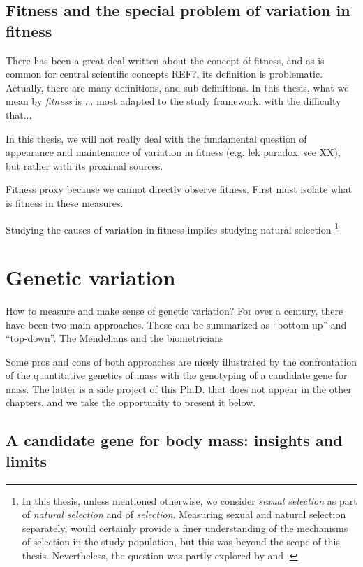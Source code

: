 \subsection{Fitness and the special problem of variation in fitness}
There has been a great deal written about the concept of fitness, and as is common for central scientific concepts REF?, its definition is problematic. Actually, there are many definitions, and sub-definitions. 
In this thesis, what we mean by \emph{fitness} is ...
most adapted to the study framework.
with the difficulty that... 

In this thesis, we will not really deal with the fundamental question of appearance and maintenance of variation in fitness (e.g. lek paradox, see XX), but rather with its proximal sources.

Fitness proxy because we cannot directly observe fitness. First must isolate what is fitness in these measures. 

Studying the causes of variation in fitness implies studying natural selection \footnote{In this thesis, unless mentioned otherwise, we consider \emph{sexual selection} as part of \emph{natural selection} and of \emph{selection}. Measuring sexual and natural selection separately, would certainly provide a finer understanding of the mechanisms of selection in the study population, but this was beyond the scope of this thesis. Nevertheless, the question was partly explored by \cite{Garcia-Navas2016} and \cite{Garcia-Navas2015a}.}

 
\section{Genetic variation}

How to measure and make sense of genetic variation?
For over a century, there have been two main approaches. 
These can be summarized as ``bottom-up'' and ``top-down''.
The Mendelians and the biometricians

Some pros and cons of both approaches are nicely illustrated by the confrontation of the quantitative genetics of mass with the genotyping of a candidate gene for mass. The latter is a side project of this Ph.D. that does not appear in the other chapters, and we take the opportunity to present it below.

\subsection{A candidate gene for body mass: insights and limits}

